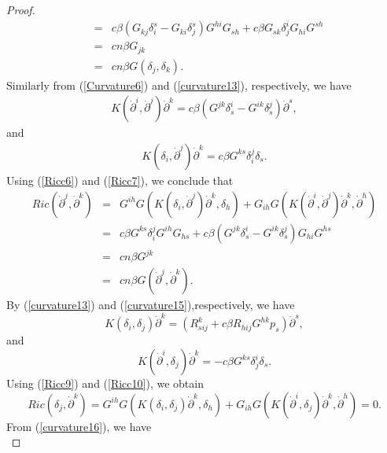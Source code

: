\documentclass[10pt,a4paper]{article}
\theoremstyle{plain}
\theoremstyle{definition}
\begin{document}
\begin{proof}
\begin{eqnarray}
\!\!\!\!&=&\!\!\!\!c\beta(G_{kj}\delta^s_i-G_{ki}\delta^s_j)G^{hi}G_{sh}+c\beta
G_{sk}\delta^i_jG_{hi}G^{sh}\nonumber\\
\!\!\!\!&=&\!\!\!\!cn\beta G_{jk}\nonumber\\
\!\!\!\!&=&\!\!\!\!cn\beta
G(\delta_j,\delta_k).\label{Ricc5}
\end{eqnarray}
Similarly from (\ref{Curvature6}) and (\ref{curvature13}),
respectively, we have
\begin{eqnarray}
K({\dot{\partial}}^i,{\dot{\partial}}^j){\dot{\partial}}^k=c\beta(G^{jk}\delta^i_s-G^{ik}\delta^j_s){\dot{\partial}}^s,\label{Ricc6}
\end{eqnarray}
and
\begin{eqnarray}
K(\delta_i,{\dot{\partial}}^j){\dot{\partial}}^k=c\beta
G^{ks}\delta^j_i\delta_s.\label{Ricc7}
\end{eqnarray}
Using (\ref{Ricc6}) and (\ref{Ricc7}), we conclude that
\begin{eqnarray}
Ric({\dot{\partial}}^j,{\dot{\partial}}^k)\!\!\!\!&=&\!\!\!\!G^{ih}G(K(\delta_i,{\dot{\partial}}^j){\dot{\partial}}^k,\delta_h)
+G_{ih}G(K({\dot{\partial}}^i,{\dot{\partial}}^j){\dot{\partial}}^k,{\dot{\partial}}^h)\nonumber\\
\!\!\!\!&=&\!\!\!\!c\beta G^{ks}\delta^j_iG^{ih}G_{hs}+c\beta(G^{jk}\delta^i_s-G^{ik}\delta^j_s)G_{hi}G^{hs}\nonumber\\
\nonumber\!\!\!\!&=&\!\!\!\!cn\beta G^{jk}\\
\!\!\!\!&=&\!\!\!\!cn\beta
G({\dot{\partial}}^j,{\dot{\partial}}^k).\label{Ricc8}
\end{eqnarray}
By (\ref{curvature13}) and (\ref{curvature15}),respectively,  we have
\begin{equation}
K(\delta_i,\delta_j){\dot{\partial}}^k=(R^k_{sij}+c\beta
R_{hij}G^{hk}p_s){\dot{\partial}}^s,\label{Ricc9}
\end{equation}
and
\begin{equation}
K({\dot{\partial}}^i,\delta_j){\dot{\partial}}^k=-c\beta
G^{ks}\delta^i_j\delta_s.\label{Ricc10}
\end{equation}
Using (\ref{Ricc9}) and (\ref{Ricc10}), we obtain
\begin{equation}
Ric(\delta_j,{\dot{\partial}}^k)=G^{ih}G(K(\delta_i,\delta_j){\dot{\partial}}^k,\delta_h)
+G_{ih}G(K({\dot{\partial}}^i,\delta_j){\dot{\partial}}^k,{\dot{\partial}}^h)=0.\label{Ricc11}
\end{equation}
From (\ref{curvature16}), we have
\begin{equation}

\end{equation}
\end{proof}
\end{document}
